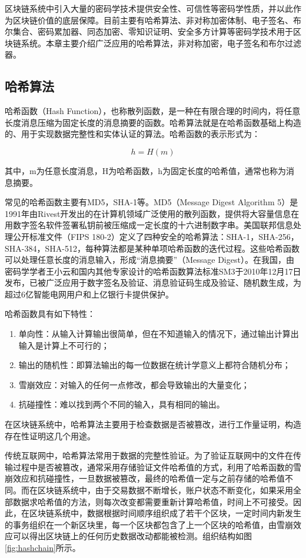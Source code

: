 区块链系统中引入大量的密码学技术提供安全性、可信性等密码学性质，并以此作为区块链价值的底层保障。目前主要有哈希算法、非对称加密体制、电子签名、布尔集合、密码累加器、同态加密、零知识证明、安全多方计算等密码学技术用于区块链系统。本章主要介绍广泛应用的哈希算法，非对称加密，电子签名和布尔过滤器。

\subsection{哈希算法}

哈希函数（Hash Function），也称散列函数，是一种在有限合理的时间内，将任意长度消息压缩为固定长度的消息摘要的函数。哈希算法就是在哈希函数基础上构造的、用于实现数据完整性和实体认证的算法。哈希函数的表示形式为：

$$h=H(m)$$

其中，m为任意长度消息，H为哈希函数，h为固定长度的哈希值，通常也称为消息摘要。

常见的哈希函数主要有MD5，SHA-1等。MD5（Message Digest Algorithm 5）是1991年由Rivest开发出的在计算机领域广泛使用的散列函数，提供将大容量信息在用数字签名软件签署私钥前被压缩成一定长度的十六进制数字串。美国联邦信息处理公开标准文件（FIPS 180-2）定义了四种安全的哈希算法：SHA-1，SHA-256，SHA-384，SHA-512，每种算法都是某种单项哈希函数的迭代过程。这些哈希函数可以处理任意长度的消息输入，形成“消息摘要”（Message Digest）。在我国，由密码学学者王小云和国内其他专家设计的哈希函数算法标准SM3于2010年12月17日发布，已被广泛应用于数字签名及验证、消息验证码生成及验证、随机数生成，为超过6亿智能电网用户和上亿银行卡提供保护。

哈希函数具有如下特性：
\begin{enumerate}
\item 单向性：从输入计算输出很简单，但在不知道输入的情况下，通过输出计算出输入是计算上不可行的；
\item 输出的随机性：即算法输出的每一位数据在统计学意义上都符合随机分布；
\item 雪崩效应：对输入的任何一点修改，都会导致输出的大量变化；
\item 抗碰撞性：难以找到两个不同的输入，具有相同的输出。
\end{enumerate}

在区块链系统中，哈希算法主要用于检查数据是否被篡改，进行工作量证明，构造存在性证明这几个用途。

传统互联网中，哈希算法常用于数据的完整性验证。为了验证互联网中的文件在传输过程中是否被篡改，通常采用存储验证文件哈希值的方式，利用了哈希函数的雪崩效应和抗碰撞性，一旦数据被篡改，最终的哈希值一定与之前存储的哈希值不同。而在区块链系统中，由于交易数据不断增长，账户状态不断变化，如果采用全部数据求哈希值的方法，则每次改变都需要重新计算哈希值，时间上不可接受。因此，在区块链系统中，数据根据时间顺序组织成了若干个区块，一定时间内新发生的事务组织在一个新区块里，每一个区块都包含了上一个区块的哈希值，由雪崩效应可以得出区块链上的任何历史数据改动都能被检测。组织结构如图\ref{fig:hashchain}所示。

